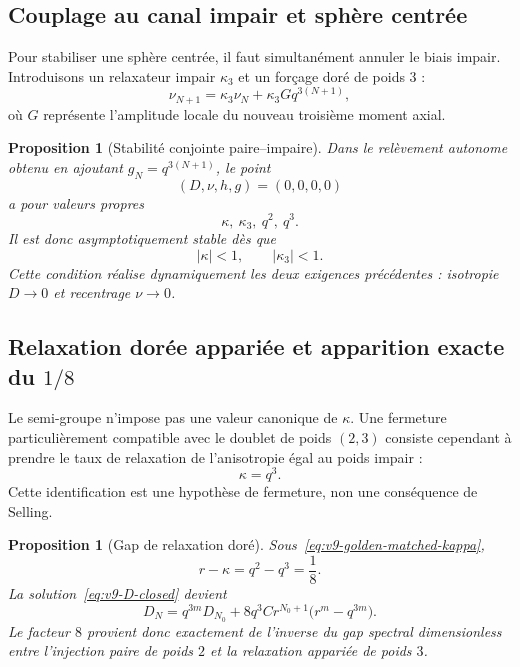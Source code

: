 \documentclass[11pt,a4paper]{article}
\newtheorem{proposition}[theorem]{Proposition}
\begin{document}
\subsection{Couplage au canal impair et sphère centrée}

Pour stabiliser une sphère centrée, il faut simultanément annuler le biais impair. Introduisons un relaxateur impair $\kappa_3$ et un forçage doré de poids $3$ :
\begin{equation}\label{eq:v9-odd-relax}
 \nu_{N+1}=\kappa_3\nu_N+\kappa_3 G q^{3(N+1)},
\end{equation}
où $G$ représente l'amplitude locale du nouveau troisième moment axial.

\begin{proposition}[Stabilité conjointe paire--impaire]\label{prop:v9-even-odd-stability}
Dans le relèvement autonome obtenu en ajoutant
$g_N=q^{3(N+1)}$, le point
\[
 (D,\nu,h,g)=(0,0,0,0)
\]
a pour valeurs propres
\begin{equation}\label{eq:v9-even-odd-eigs}
 \boxed{\kappa,\ \kappa_3,\ q^2,\ q^3.}
\end{equation}
Il est donc asymptotiquement stable dès que
\[
 |\kappa|<1,
 \qquad
 |\kappa_3|<1.
\]
Cette condition réalise dynamiquement les deux exigences précédentes : isotropie $D\to0$ et recentrage $\nu\to0$.
\end{proposition}

\subsection{Relaxation dorée appariée et apparition exacte du $1/8$}

Le semi-groupe n'impose pas une valeur canonique de $\kappa$. Une fermeture particulièrement compatible avec le doublet de poids $(2,3)$ consiste cependant à prendre le taux de relaxation de l'anisotropie égal au poids impair :
\begin{equation}\label{eq:v9-golden-matched-kappa}
 \boxed{\kappa=q^3.}
\end{equation}
Cette identification est une hypothèse de fermeture, non une conséquence de Selling.

\begin{proposition}[Gap de relaxation doré]\label{prop:v9-golden-relax-gap}
Sous~\eqref{eq:v9-golden-matched-kappa},
\begin{equation}\label{eq:v9-relax-gap-eighth}
 \boxed{r-\kappa=q^2-q^3=\frac18.}
\end{equation}
La solution~\eqref{eq:v9-D-closed} devient
\begin{equation}\label{eq:v9-D-goldenmatched}
 \boxed{
 D_N
 =q^{3m}D_{N_0}
 +8q^3Cr^{N_0+1}
 \bigl(r^m-q^{3m}\bigr).}
\end{equation}
Le facteur $8$ provient donc exactement de l'inverse du gap spectral dimensionless entre l'injection paire de poids $2$ et la relaxation appariée de poids $3$.
\end{proposition}
\end{document}

